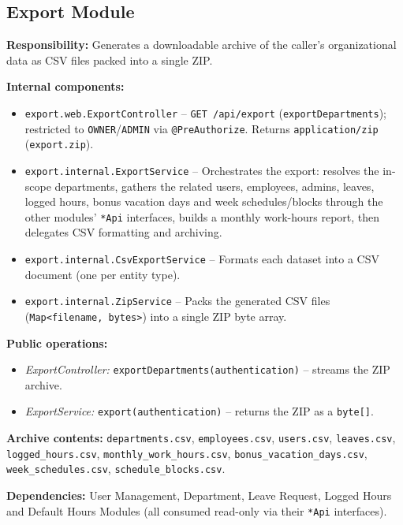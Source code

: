 \documentclass[11pt,a4paper]{article}
\begin{document}
\subsection{Export Module}

\textbf{Responsibility:} Generates a downloadable archive of the caller's organizational data as CSV files packed into a single ZIP.

\textbf{Internal components:}
\begin{itemize}[leftmargin=1.5em]
    \item \texttt{export.web.ExportController} -- \texttt{GET /api/export} (\texttt{exportDepartments}); restricted to \texttt{OWNER}/\texttt{ADMIN} via \texttt{@PreAuthorize}. Returns \texttt{application/zip} (\texttt{export.zip}).
    \item \texttt{export.internal.ExportService} -- Orchestrates the export: resolves the in-scope departments, gathers the related users, employees, admins, leaves, logged hours, bonus vacation days and week schedules/blocks through the other modules' \texttt{*Api} interfaces, builds a monthly work-hours report, then delegates CSV formatting and archiving.
    \item \texttt{export.internal.CsvExportService} -- Formats each dataset into a CSV document (one per entity type).
    \item \texttt{export.internal.ZipService} -- Packs the generated CSV files (\texttt{Map<filename, bytes>}) into a single ZIP byte array.
\end{itemize}

\textbf{Public operations:}
\begin{itemize}[leftmargin=1.5em]
    \item \textit{ExportController:} \texttt{exportDepartments(authentication)} -- streams the ZIP archive.
    \item \textit{ExportService:} \texttt{export(authentication)} -- returns the ZIP as a \texttt{byte[]}.
\end{itemize}

\textbf{Archive contents:} \texttt{departments.csv}, \texttt{employees.csv}, \texttt{users.csv}, \texttt{leaves.csv}, \texttt{logged\_hours.csv}, \texttt{monthly\_work\_hours.csv}, \texttt{bonus\_vacation\_days.csv}, \texttt{week\_schedules.csv}, \texttt{schedule\_blocks.csv}.

\textbf{Dependencies:} User Management, Department, Leave Request, Logged Hours and Default Hours Modules (all consumed read-only via their \texttt{*Api} interfaces).
\end{document}
